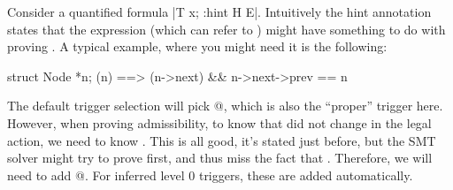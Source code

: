 Consider a quantified formula \vcc|\forall T x; {:hint H} E|.
Intuitively the hint annotation states that the expression  (which can
refer to ) might have something to do with proving .
A typical example, where you might need it is the following:
\begin{VCC}
\forall struct Node *n; \mine(n) ==> \mine(n->next) && n->next->prev == n
\end{VCC}
The default trigger selection will pick @, which is also
the ``proper'' trigger here. 
However, when proving admissibility, to know that  did not
change in the legal action, we need to know .
This is all good, it's stated just before, but the SMT solver
might try to prove  first,
and thus miss the fact that .
Therefore, we will need to add @.
For inferred level 0 triggers, these are added automatically.


%
%
%



